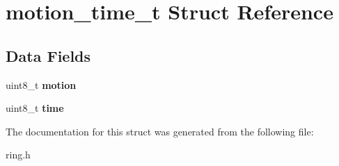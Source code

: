 \hypertarget{structmotion__time__t}{}\section{motion\+\_\+time\+\_\+t Struct Reference}
\label{structmotion__time__t}
\subsection*{Data Fields}
\begin{DoxyCompactItemize}
\item 
\mbox{\label{structmotion__time__t_af5cce4e990612a7df34e50eab7a2e587}} 
uint8\+\_\+t {\bfseries motion}
\item 
\mbox{\label{structmotion__time__t_a3b4bcf3c4c4d82f8d051e3d08a4c40a3}} 
uint8\+\_\+t {\bfseries time}
\end{DoxyCompactItemize}


The documentation for this struct was generated from the following file\+:\begin{DoxyCompactItemize}
\item 
ring.\+h\end{DoxyCompactItemize}
